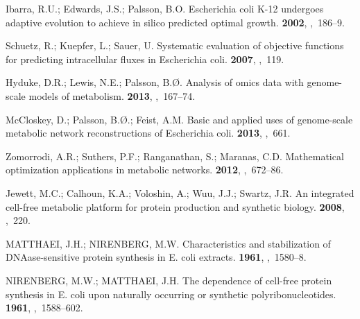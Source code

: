 \documentclass[processes,article,accept,moreauthors,pdftex,12pt,a4paper]{mdpi}
\begin{document}
\begin{thebibliography}{----}
Ibarra, R.U.; Edwards, J.S.; Palsson, B.O.
\newblock Escherichia coli K-12 undergoes adaptive evolution to achieve in
  silico predicted optimal growth.
 {\bf 2002},
,~186--9.

Schuetz, R.; Kuepfer, L.; Sauer, U.
\newblock Systematic evaluation of objective functions for predicting
  intracellular fluxes in Escherichia coli.
 {\bf 2007},
,~119.

Hyduke, D.R.; Lewis, N.E.; Palsson, B.{\O}.
\newblock Analysis of omics data with genome-scale models of metabolism.
 {\bf 2013},
,~167--74.

McCloskey, D.; Palsson, B.{\O}.; Feist, A.M.
\newblock Basic and applied uses of genome-scale metabolic network
  reconstructions of Escherichia coli.
 {\bf 2013},
,~661.

Zomorrodi, A.R.; Suthers, P.F.; Ranganathan, S.; Maranas, C.D.
\newblock Mathematical optimization applications in metabolic networks.
 {\bf 2012},
,~672--86.

Jewett, M.C.; Calhoun, K.A.; Voloshin, A.; Wuu, J.J.; Swartz, J.R.
\newblock An integrated cell-free metabolic platform for protein production and
  synthetic biology.
 {\bf 2008},
,~220.

MATTHAEI, J.H.; NIRENBERG, M.W.
\newblock Characteristics and stabilization of DNAase-sensitive protein
  synthesis in E. coli extracts.
 {\bf 1961},
,~1580--8.

NIRENBERG, M.W.; MATTHAEI, J.H.
\newblock The dependence of cell-free protein synthesis in E. coli upon
  naturally occurring or synthetic polyribonucleotides.
 {\bf 1961},
,~1588--602.


\end{thebibliography}
\end{document}
